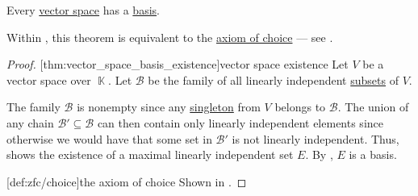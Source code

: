 \begin{theorem}\label{thm:vector_space_basis_existence}
  Every \hyperref[def:vector_space]{vector space} has a \hyperref[def:hamel_basis]{basis}.

  Within \hyperref[def:zfc]{}, this theorem is equivalent to the \hyperref[def:zfc/choice]{axiom of choice} --- see .
\end{theorem}
\begin{proof}
  [thm:vector_space_basis_existence]{vector space existence} Let \( V \) be a vector space over \( \BbbK \). Let \( \mathcal{B} \) be the family of all linearly independent \hyperref[rem:linear_combinations]{subsets} of \( V \).

  The family \( \mathcal{B} \) is nonempty since any \hyperref[rem:singleton_sets]{singleton} from \( V \) belongs to \( \mathcal{B} \). The union of any chain \( \mathcal{B}' \subseteq \mathcal{B} \) can then contain only linearly independent elements since otherwise we would have that some set in \( \mathcal{B}' \) is not linearly independent. Thus,  shows the existence of a maximal linearly independent set \( E \). By , \( E \) is a basis.

  [def:zfc/choice]{the axiom of choice} Shown in \cite{Blass1984}.
\end{proof}

